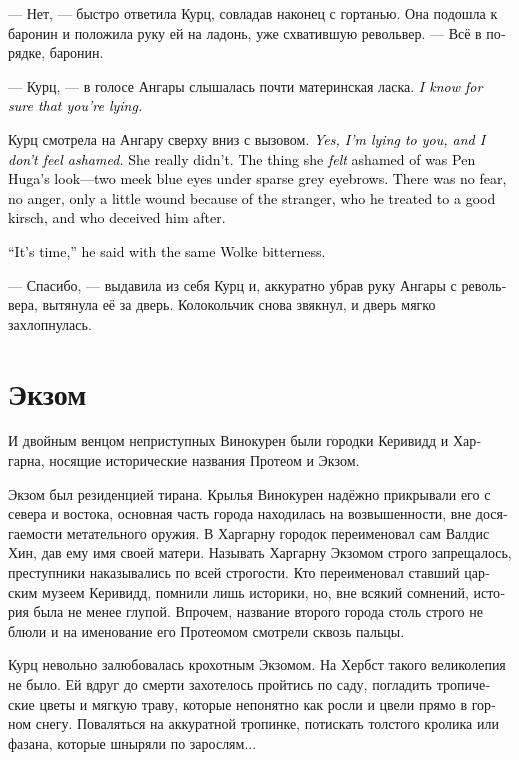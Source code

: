 \documentclass[a4paper,12pt,fleqn]{book}\usepackage{cooltooltips}\usepackage{polyglossia}\setdefaultlanguage[babelshorthands=true]{russian}\setotherlanguage{english}\defaultfontfeatures{Ligatures=TeX,Mapping=tex-text} \usepackage{xcolor}\definecolor{lightgray}{HTML}{bbbbbb}\color{lightgray}\newcommand{\ml}[3]{\textenglish{\textcolor{black}{#3}}}
\begin{document}
--- Нет, --- быстро ответила Курц, совладав наконец с гортанью.
Она подошла к баронин и положила руку ей на ладонь, уже схватившую револьвер.
--- Всё в порядке, баронин.

--- Курц, --- в голосе Ангары слышалась почти материнская ласка.
\ml{$0$}
{<<Я прекрасно знаю, что ты врёшь>>.}
{\textit{I know for sure that you're lying.}}

Курц смотрела на Ангару сверху вниз с вызовом.
\ml{$0$}
{<<Да, я вру тебе, и мне не стыдно>>.}
{\textit{Yes, I'm lying to you, and I don't feel ashamed.}}
\ml{$0$}
{Ей и правда не было стыдно.}
{She really didn't.}
\ml{$0$}
{От чего ей \emph{было} стыдно, так это от взгляда пэна Хуги --- два кротких голубых глаза под редкими седыми бровями.}
{The thing she \emph{felt} ashamed of was Pen Huga's look---two meek blue eyes under sparse grey eyebrows.}
\ml{$0$}
{В этом взгляде не было страха, не было злости, лишь лёгкая обида от того, что странница, которую он угостил хорошим киршем, его обманула.}
{There was no fear, no anger, only a little wound because of the stranger, who he treated to a good kirsch, and who deceived him after.}

\ml{$0$}
{--- Тебе пора, --- сказал он с той же волькейской горечью.}
{``It's time,'' he said with the same Wolke bitterness.}

--- Спасибо, --- выдавила из себя Курц и, аккуратно убрав руку Ангары с револьвера, вытянула её за дверь.
Колокольчик снова звякнул, и дверь мягко захлопнулась.

\section{Экзом}

И двойным венцом неприступных Винокурен были городки Керивидд и Харгарна, носящие исторические названия Протеом и Экзом.

Экзом был резиденцией тирана.
Крылья Винокурен надёжно прикрывали его с севера и востока, основная часть города находилась на возвышенности, вне досягаемости метательного оружия.
В Харгарну городок переименовал сам Валдис Хин, дав ему имя своей матери.
Называть Харгарну Экзомом строго запрещалось, преступники наказывались по всей строгости.
Кто переименовал ставший царским музеем Керивидд, помнили лишь историки, но, вне всякий сомнений, история была не менее глупой.
Впрочем, название второго города столь строго не блюли и на именование его Протеомом смотрели сквозь пальцы.

Курц невольно залюбовалась крохотным Экзомом.
На Хербст такого великолепия не было.
Ей вдруг до смерти захотелось пройтись по саду, погладить тропические цветы и мягкую траву, которые непонятно как росли и цвели прямо в горном снегу.
Поваляться на аккуратной тропинке, потискать толстого кролика или фазана, которые шныряли по зарослям...
\end{document}
